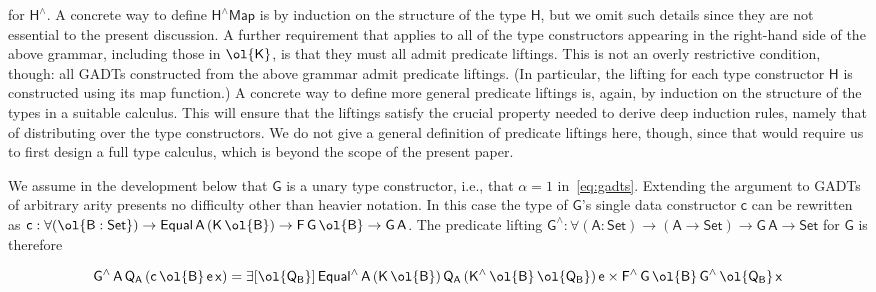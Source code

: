 \documentclass[9pt]{entcs}
\begin{document}
\vspace*{0.05in}

\noindent
for $\mathsf{H^{\wedge}}$. A concrete way to define $\mathsf{H^\wedge
  Map}$ is by induction on the structure of the type $\mathsf{H}$, but
we omit such details since they are not essential to the present
discussion. A further requirement that applies to all of the type
constructors appearing in the right-hand side of the above grammar,
including those in $\ol{\mathsf{K}}$, is that they must all admit
predicate liftings. This is not an overly restrictive condition,
though: all
GADTs constructed from the above grammar admit predicate liftings.
(In particular, the lifting for each type constructor $\mathsf{H}$ is
constructed using its map function.)
A concrete way to define more general predicate liftings is, again, by
induction on the structure of the types in a suitable calculus. This
will ensure that the liftings satisfy the crucial property needed to
derive deep induction rules, namely that of distributing over the type
constructors. We do not give a general definition of predicate
liftings here, though, since that would require us to first design a
full type calculus, which is beyond the scope of the present paper.

We assume in the development below that $\mathsf{G}$ is a unary type
constructor, i.e., that $\alpha = 1$ in~\eqref{eq:gadts}. Extending
the argument to GADTs of arbitrary arity presents no difficulty other
than heavier notation. In this case the type of $\mathsf{G}$'s single
data constructor $\mathsf{c}$ can be rewritten as $\mathsf{c : \forall
  (\ol{B : Set}) \to Equal\,A\,(K\,\ol{B}) \to F\,G\,\ol{B} \to
  G\,A}$. The predicate lifting $\mathsf{G^{\wedge} : \forall (A :
  Set) \to (A \to Set) \to G\,A \to Set}$ for $\mathsf{G}$ is
therefore

\vspace*{-0.05in}

\[\mathsf{G^{\wedge}\,A\,Q_A\,(c\,\ol{B}\,e\,x)
= \exists [\ol{Q_B}]\,
Equal^{\wedge}\,A\,(K\,\ol{B})\,Q_A\,(K^{\wedge}\,\ol{B}\,\ol{Q_B})\,e
\times F^{\wedge}\,G\,\ol{B}\,G^{\wedge}\,{\ol{Q_B}}\,x}\]
\end{document}
